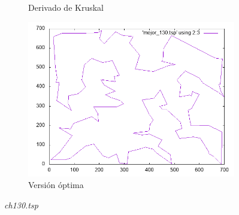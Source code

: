 \documentclass[12pt,spanish]{article}
\begin{document}
\begin{figure}[H]
\begin{subfigure}[b]{0.36\textwidth}
\caption{Derivado de Kruskal}
\end{subfigure}
\quad
\begin{subfigure}[b]{0.36\textwidth}
\includegraphics[width=\textwidth]{ch130_mejor.png}
\caption{Versión óptima}
\end{subfigure}
\caption{\textit{ch130.tsp}}
\end{figure}
\end{document}
